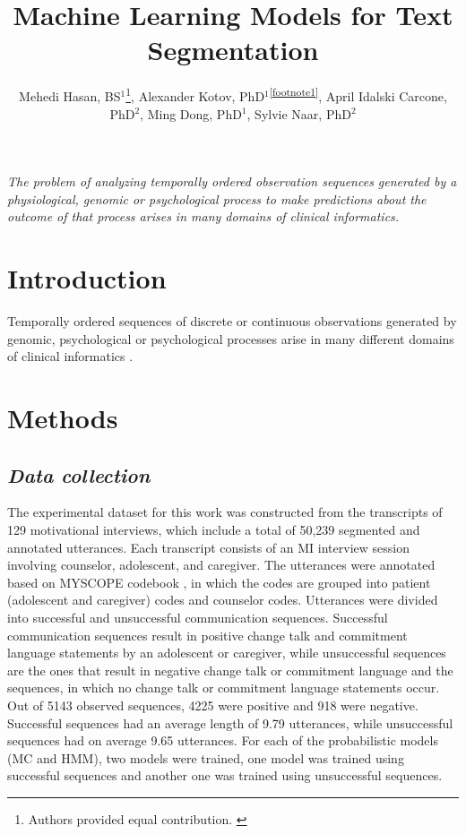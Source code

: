 \documentclass{amia}
\begin{document}
\title{Machine Learning Models for Text Segmentation}

\author{Mehedi Hasan, BS$^{1}$\footnote[1]{Authors provided equal contribution. \label{footnote1}}, Alexander Kotov, PhD$^{1}$\textsuperscript{\ref{footnote1}}, April Idalski Carcone, PhD$^{2}$, Ming Dong, PhD$^{1}$, Sylvie Naar, PhD$^{2}$}


\maketitle

\textit{The problem of analyzing temporally ordered observation sequences generated by a physiological, genomic or psychological process to make predictions about the outcome of that process arises in
many domains of clinical informatics.}

\section*{Introduction}
Temporally ordered sequences of discrete or continuous observations generated by genomic, psychological or psychological processes arise in many different domains of clinical informatics \cite{kotov2015interpretable}\cite{hasan2016study}.

\section*{Methods}
\subsection*{\textit{Data collection}}
The experimental dataset for this work was constructed from the transcripts of 129 motivational interviews, which include a total of 50,239 segmented and annotated utterances. Each transcript consists
of an MI interview session involving counselor, adolescent, and caregiver. The utterances were annotated based on MYSCOPE codebook \cite{carcone2013provider}, in which the codes are grouped into
patient (adolescent and caregiver) codes and counselor codes. Utterances were divided into successful and unsuccessful communication sequences. Successful communication sequences result in
positive change talk and commitment language statements by an adolescent or caregiver, while unsuccessful sequences are the ones that result in negative change talk or commitment language and the
sequences, in which no change talk or commitment language statements occur. Out of 5143 observed sequences, 4225 were positive and 918 were negative. Successful sequences had an average length of
9.79 utterances, while unsuccessful sequences had on average 9.65 utterances. For each of the probabilistic models (MC and HMM), two models were trained, one model was trained using successful
sequences and another one was trained using unsuccessful sequences. 
\end{document}
